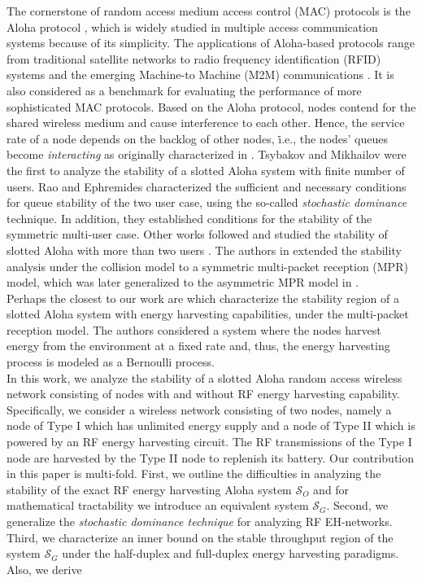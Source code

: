 \documentclass[draftcls,12pt,onecolumn]{IEEEtran}
\begin{document}
\newline \indent The cornerstone of random access medium access control (MAC) protocols is the Aloha protocol \cite{abramson1970aloha}, which is widely studied in multiple access communication systems because of its simplicity. The applications of Aloha-based protocols range from traditional satellite networks \cite{okada1977analysis} to radio frequency identification (RFID) systems \cite{zhu2011critical} and the emerging Machine-to Machine (M2M) communications \cite{wu2013fasa}. It is also considered as a benchmark for evaluating the performance of more sophisticated MAC protocols. Based on the Aloha protocol, nodes contend for the shared wireless medium and cause interference to each other. Hence, the service rate of a node depends on the backlog of other nodes, \.i.e., the nodes' queues become \emph{interacting} as originally characterized in \cite{fayolle1979two}. Tsybakov and Mikhailov \cite{tsybakov1979ergodicity} were the first to analyze the stability of a slotted Aloha system with finite number of users. Rao and Ephremides \cite{rao1988stability} characterized the sufficient and necessary conditions for queue stability of the two user case, using the so-called \emph{stochastic dominance} technique. In addition, they established conditions for the stability of the symmetric multi-user case. Other works followed and studied the stability of slotted Aloha with more than two users \cite{luo1999stability, bordenave2012asymptotic,kompalli2013stability,szpankowski}. The authors in \cite{ghez1988stability} extended the stability analysis under the collision model to a symmetric multi-packet reception (MPR) model, which was later generalized to the asymmetric MPR model in \cite{naware2005stability}.\\ 
\indent Perhaps the closest to our work are \cite{jeon2011stability,jeon2015stability} which characterize the stability region of a slotted Aloha system with energy harvesting capabilities, under the multi-packet reception model. The authors considered a system where the nodes harvest energy from the environment at a fixed rate and, thus, the energy harvesting process is modeled as a Bernoulli process.\\
\indent In this work, we analyze the stability of a slotted Aloha random access wireless network consisting of nodes with and without RF energy harvesting capability. Specifically, we consider a wireless network consisting of two nodes, namely a node of Type I which has unlimited energy supply and a node of Type II which is powered by an RF energy harvesting circuit. The RF transmissions of the Type I node are harvested by the Type II node to replenish its battery. Our contribution in this paper is multi-fold. First, we outline the difficulties in analyzing the stability of the exact RF energy harvesting Aloha system $\mathcal{S}_O$ and for mathematical tractability we introduce an equivalent system $\mathcal{S}_G$. Second, we generalize the \emph{stochastic dominance technique} for analyzing RF EH-networks. Third, we characterize an inner bound on the stable throughput region of the system $\mathcal{S}_G$ under the half-duplex and full-duplex energy harvesting paradigms. Also, we derive 
\end{document}
